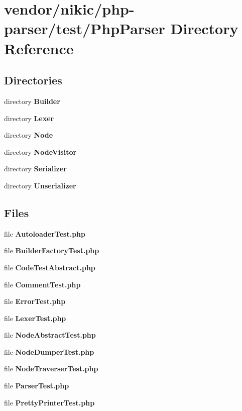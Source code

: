 \section{vendor/nikic/php-\/parser/test/\+Php\+Parser Directory Reference}
\label{dir_10e6430c0d1717bf0316f853354f78af}
\subsection*{Directories}
\begin{DoxyCompactItemize}
\item 
directory {\bf Builder}
\item 
directory {\bf Lexer}
\item 
directory {\bf Node}
\item 
directory {\bf Node\+Visitor}
\item 
directory {\bf Serializer}
\item 
directory {\bf Unserializer}
\end{DoxyCompactItemize}
\subsection*{Files}
\begin{DoxyCompactItemize}
\item 
file {\bf Autoloader\+Test.\+php}
\item 
file {\bf Builder\+Factory\+Test.\+php}
\item 
file {\bf Code\+Test\+Abstract.\+php}
\item 
file {\bf Comment\+Test.\+php}
\item 
file {\bf Error\+Test.\+php}
\item 
file {\bf Lexer\+Test.\+php}
\item 
file {\bf Node\+Abstract\+Test.\+php}
\item 
file {\bf Node\+Dumper\+Test.\+php}
\item 
file {\bf Node\+Traverser\+Test.\+php}
\item 
file {\bf Parser\+Test.\+php}
\item 
file {\bf Pretty\+Printer\+Test.\+php}
\end{DoxyCompactItemize}
